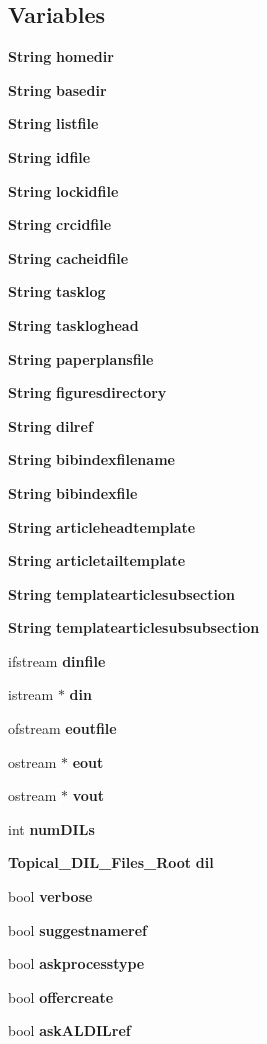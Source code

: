 \subsection*{Variables}
\begin{CompactItemize}
\item 
{\bf String} {\bf homedir}
\item 
{\bf String} {\bf basedir}
\item 
{\bf String} {\bf listfile}
\item 
{\bf String} {\bf idfile}
\item 
{\bf String} {\bf lockidfile}
\item 
{\bf String} {\bf crcidfile}
\item 
{\bf String} {\bf cacheidfile}
\item 
{\bf String} {\bf tasklog}
\item 
{\bf String} {\bf taskloghead}
\item 
{\bf String} {\bf paperplansfile}
\item 
{\bf String} {\bf figuresdirectory}
\item 
{\bf String} {\bf dilref}
\item 
{\bf String} {\bf bibindexfilename}
\item 
{\bf String} {\bf bibindexfile}
\item 
{\bf String} {\bf articleheadtemplate}
\item 
{\bf String} {\bf articletailtemplate}
\item 
{\bf String} {\bf templatearticlesubsection}
\item 
{\bf String} {\bf templatearticlesubsubsection}
\item 
ifstream {\bf dinfile}
\item 
istream $\ast$ {\bf din}
\item 
ofstream {\bf eoutfile}
\item 
ostream $\ast$ {\bf eout}
\item 
ostream $\ast$ {\bf vout}
\item 
int {\bf num\-DILs}
\item 
{\bf Topical\_\-DIL\_\-Files\_\-Root} {\bf dil}
\item 
bool {\bf verbose}
\item 
bool {\bf suggestnameref}
\item 
bool {\bf askprocesstype}
\item 
bool {\bf offercreate}
\item 
bool {\bf ask\-ALDILref}
\item 

\end{CompactItemize}

